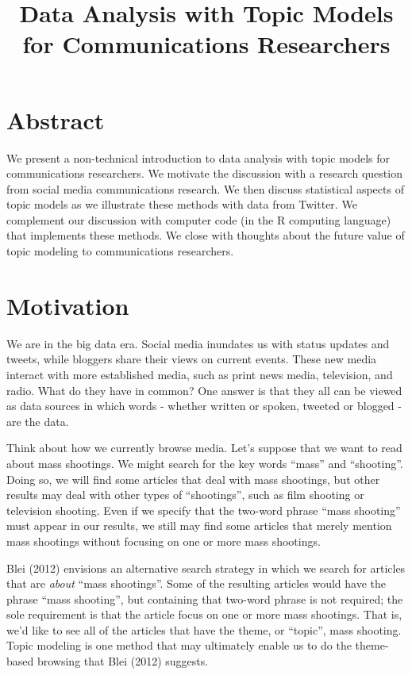\documentclass[12pt,]{article}
\title{Data Analysis with Topic Models for Communications Researchers}
\author{}
\date{}
\begin{document}
\maketitle

\pagestyle{fancy}

\listoftodos

\section{Abstract}\label{abstract}

We present a non-technical introduction to data analysis with topic
models for communications researchers. We motivate the discussion with a
research question from social media communications research. We then
discuss statistical aspects of topic models as we illustrate these
methods with data from Twitter. We complement our discussion with
computer code (in the R computing language) that implements these
methods. We close with thoughts about the future value of topic modeling
to communications researchers.

\section{Motivation}\label{motivation}


We are in the big data era. Social media inundates us with status
updates and tweets, while bloggers share their views on current events.
These new media interact with more established media, such as print news
media, television, and radio. What do they have in common? One answer is
that they all can be viewed as data sources in which words - whether
written or spoken, tweeted or blogged - are the data.

Think about how we currently browse media. Let's suppose that we want to
read about mass shootings. We might search for the key words ``mass''
and ``shooting''. Doing so, we will find some articles that deal with
mass shootings, but other results may deal with other types of
``shootings'', such as film shooting or television shooting. Even if we
specify that the two-word phrase ``mass shooting'' must appear in our
results, we still may find some articles that merely mention mass
shootings without focusing on one or more mass shootings.

Blei (2012) envisions an alternative search strategy in which we search
for articles that are \emph{about} ``mass shootings''. Some of the
resulting articles would have the phrase ``mass shooting'', but
containing that two-word phrase is not required; the sole requirement is
that the article focus on one or more mass shootings. That is, we'd like
to see all of the articles that have the theme, or ``topic'', mass
shooting. Topic modeling is one method that may ultimately enable us to
do the theme-based browsing that Blei (2012) suggests.
\end{document}
